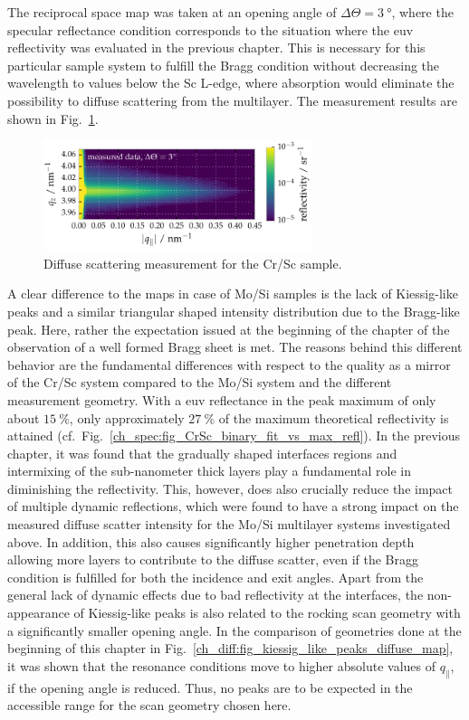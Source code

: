 The reciprocal space map was taken at an opening angle of $\Delta \Theta = \SI{3}{\degree}$, where the specular reflectance condition corresponds to the situation where the \gls{euv} reflectivity was evaluated in the previous chapter. This is necessary for this particular sample system to fulfill the Bragg condition without decreasing the wavelength to values below the Sc L-edge, where absorption would eliminate the possibility to diffuse scattering from the multilayer. The measurement results are shown in Fig.~\ref{ch_diff:fig_CrSc_diffuse_meas}.
\begin{figure}[htbp]
  \centering
  \includegraphics[width=0.7\textwidth]{img/CrSc_diffuse_measured}
  \caption{Diffuse scattering measurement for the Cr/Sc sample.}
  \label{ch_diff:fig_CrSc_diffuse_meas}
\end{figure}
A clear difference to the maps in case of Mo/Si samples is the lack of Kiessig-like peaks and a similar triangular shaped intensity distribution due to the Bragg-like peak. Here, rather the expectation issued at the beginning of the chapter of the observation of a well formed Bragg sheet is met. The reasons behind this different behavior are the fundamental differences with respect to the quality as a mirror of the Cr/Sc system compared to the Mo/Si system and the different measurement geometry. With a \gls{euv} reflectance in the peak maximum of only about $\SI{15}{\percent}$, only approximately $\SI{27}{\percent}$ of the maximum theoretical reflectivity is attained (cf.~Fig.~\ref{ch_spec:fig_CrSc_binary_fit_vs_max_refl}). In the previous chapter, it was found that the gradually shaped interfaces regions and intermixing of the sub-nanometer thick layers play a fundamental role in diminishing the reflectivity. This, however, does also crucially reduce the impact of multiple dynamic reflections, which were found to have a strong impact on the measured diffuse scatter intensity for the Mo/Si multilayer systems investigated above. In addition, this also causes significantly higher penetration depth allowing more layers to contribute to the diffuse scatter, even if the Bragg condition is fulfilled for both the incidence and exit angles. Apart from the general lack of dynamic effects due to bad reflectivity at the interfaces, the non-appearance of Kiessig-like peaks is also related to the rocking scan geometry with a significantly smaller opening angle. In the comparison of geometries done at the beginning of this chapter in Fig.~\ref{ch_diff:fig_kiessig_like_peaks_diffuse_map}, it was shown that the resonance conditions move to higher absolute values of $q_\parallel$, if the opening angle is reduced. Thus, no peaks are to be expected in the accessible range for the scan geometry chosen here.

